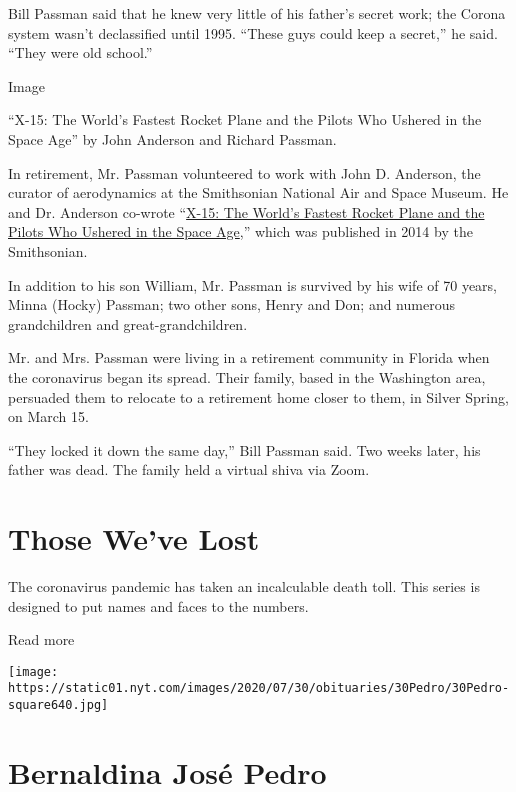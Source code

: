 Bill Passman said that he knew very little of his father's secret work;
the Corona system wasn't declassified until 1995. ``These guys could
keep a secret,'' he said. ``They were old school.''

Image

``X-15: The World's Fastest Rocket Plane and the Pilots Who Ushered in
the Space Age'' by John Anderson and Richard Passman.

In retirement, Mr. Passman volunteered to work with John D. Anderson,
the curator of aerodynamics at the Smithsonian National Air and Space
Museum. He and Dr. Anderson co-wrote
``\href{https://www.thespacereview.com/article/2448/1}{X-15: The World's
Fastest Rocket Plane and the Pilots Who Ushered in the Space Age},''
which was published in 2014 by the Smithsonian.

In addition to his son William, Mr. Passman is survived by his wife of
70 years, Minna (Hocky) Passman; two other sons, Henry and Don; and
numerous grandchildren and great-grandchildren.

Mr. and Mrs. Passman were living in a retirement community in Florida
when the coronavirus began its spread. Their family, based in the
Washington area, persuaded them to relocate to a retirement home closer
to them, in Silver Spring, on March 15.

``They locked it down the same day,'' Bill Passman said. Two weeks
later, his father was dead. The family held a virtual shiva via Zoom.

\href{https://www.nytimes.com/interactive/2020/obituaries/people-died-coronavirus-obituaries.html?action=click\&pgtype=Article\&state=default\&region=BELOW_MAIN_CONTENT\&context=covid_obits_promo}{}

\hypertarget{those-weve-lost}{%
\section{Those We've Lost}\label{those-weve-lost}}

The coronavirus pandemic has taken an incalculable death toll. This
series is designed to put names and faces to the numbers.

Read more

\texttt{[image: https://static01.nyt.com/images/2020/07/30/obituaries/30Pedro/30Pedro-square640.jpg]}

\hypertarget{bernaldina-josuxe9-pedro}{%
\section{Bernaldina José Pedro}\label{bernaldina-josuxe9-pedro}}

